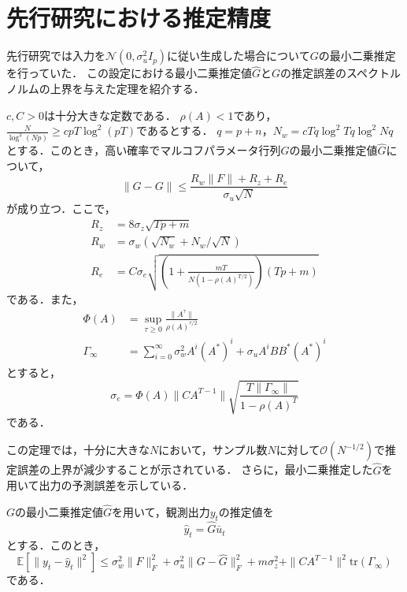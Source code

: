 \section{先行研究における推定精度}
先行研究では入力を$\mathcal{N}(0, \sigma_u^2I_p)$に従い生成した場合について$G$の最小二乗推定
を行っていた．
この設定における最小二乗推定値$\hat{G}$と$G$の推定誤差のスペクトルノルムの上界を与えた定理を紹介する．
\begin{thm}
\cite{RHKB}
\label{thm_prev_error_bound}
    $c, C >0$は十分大きな定数である．
    $\rho(A) < 1$であり，$\frac{N}{\log^2{(Np)}} \geq cpT\log^2{(pT)}$であるとする．
    $q = p+n$，$N_w = cTq\log^2{Tq}\log^2{Nq}$とする．このとき，高い確率でマルコフパラメータ行列$G$の最小二乗推定値$\hat{G}$について，
    \begin{equation*}
        \| \hat{G}-G \| \leq \frac{R_w\|F\| + R_z + R_e}{\sigma_u\sqrt{N}}
    \end{equation*}
    が成り立つ．ここで，
    \begin{align*}
        R_z &= 8\sigma_z \sqrt{Tp + m} \\
        R_w &= \sigma_w (\sqrt{N_w} + N_w/\sqrt{N}) \\
        R_e &= C\sigma_e \sqrt{ \left( 1+\frac{mT}{N(1-\rho(A)^{T/2})}  \right)(Tp + m) }
    \end{align*}
    である．また，
    \begin{align*}
        \Phi(A) &= \sup_{\tau \geq 0} \frac{\|A^{\tau}\|}{\rho(A)^{\tau/2}} \\
        \Gamma_{\infty} &= \sum_{i = 0}^{\infty} \sigma_w^2A^i(A^*)^i + \sigma_uA^iBB^*(A^*)^i
    \end{align*}
    とすると，
    \begin{equation*}
        \sigma_e = \Phi(A)\|CA^{T-1}\|\sqrt{\frac{T\|\Gamma_{\infty}\|}{1-\rho(A)^T}}
    \end{equation*}
    である．
\end{thm}

この定理では，十分に大きな$N$において，サンプル数$N$に対して$\mathcal{O}(N^{-1/2})$で推定誤差の上界が減少することが示されている．
さらに，最小二乗推定した$\hat{G}$を用いて出力の予測誤差を示している．

\begin{sub}
\cite{RHKB}
\label{sub_estimate_y}
    $G$の最小二乗推定値$\hat{G}$を用いて，観測出力$y_t$の推定値を
    \begin{equation*}
        \hat{y}_t = \hat{G}\bar{u}_t 
    \end{equation*}
    とする．このとき，
    \begin{equation*}
        \mathbb{E}[\|y_t-\hat{y}_t\|^2] \leq \sigma_w^2\|F\|_F^2 + \sigma_u^2\|G-\hat{G}\|_F^2 + m\sigma_z^2 + \|CA^{T-1}\|^2 \text{tr}(\Gamma_{\infty})
    \end{equation*}
    である．
\end{sub}


